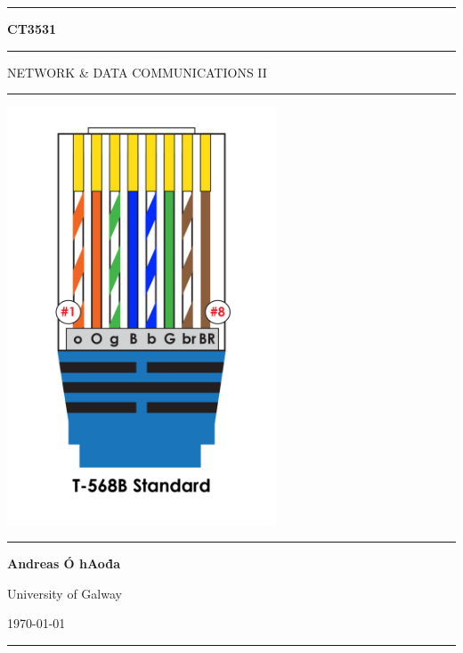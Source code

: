 \documentclass[a4paper,11pt]{article}
\begin{document}
\begin{titlepage}
    \begin{center}
        \hrule
        \vspace*{0.6cm}
        \huge \textbf{CT3531}
        \vspace*{0.6cm}
        \hrule
        \LARGE
       \vspace{0.5cm}
        NETWORK \& DATA COMMUNICATIONS II
       \vspace{0.5cm}
       \hrule
            
       \vfill
       \includegraphics[width=0.6\textwidth]{images/commnet-systems-inc.png}
        \vfill

        \Large
       \vspace{0.5cm}
       \hrule
       \vspace{0.5cm}
       \textbf{Andreas Ó hAoḋa}
            
       \normalsize
       University of Galway

       \today

       \vspace{0.5cm}
       \hrule
    \end{center}
\end{titlepage}

\newpage
\tableofcontents
\newpage
\setcounter{page}{1}
\end{document}
